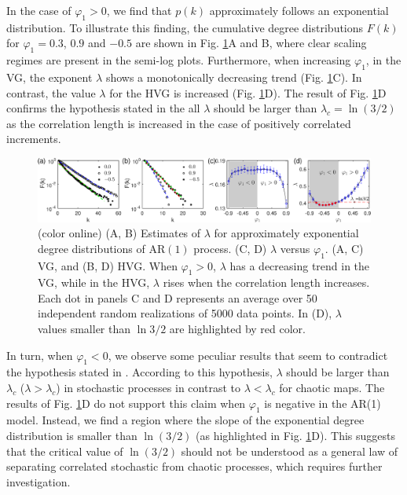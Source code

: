 		In the case of $\varphi_1 > 0$, we find that $p(k)$ approximately follows an exponential distribution. To illustrate this finding, the cumulative degree distributions $F(k)$ for $\varphi_1 = 0.3 $, $0.9$ and $-0.5$ are shown in Fig. \ref{fig:lambda_AR1}A and B, where clear scaling regimes are present in the semi-log plots. Furthermore, when increasing $\varphi_1$, in the VG, the exponent $\lambda$ shows a monotonically decreasing trend (Fig. \ref{fig:lambda_AR1}C). In contrast, the value $\lambda$ for the HVG is increased (Fig. \ref{fig:lambda_AR1}D). The result of Fig. \ref{fig:lambda_AR1}D confirms the hypothesis stated in \cite{Lacasa2010} the all $\lambda$ should be larger than $\lambda_c = \ln (3/2)$ as the correlation length is increased in the case of positively correlated increments.
\begin{figure}
	\centering
	\includegraphics[width=\columnwidth]{Chapter04_VisibilityGt/ar1_positive_lambda_vg_hvg.eps}

\caption{(color online) (A, B) Estimates of $\lambda$ for approximately exponential degree distributions of AR$(1)$ process. (C, D) $\lambda$ versus $\varphi_1$. (A, C) VG, and (B, D) HVG. When $\varphi_1>0$, $\lambda$ has a decreasing trend in the VG, while in the HVG, $\lambda$ rises when the correlation length increases. Each dot in panels C and D represents an average over 50 independent random realizations of 5000 data points. In (D), $\lambda$ values smaller than $\ln 3/2$ are highlighted by red color. \label{fig:lambda_AR1}}
\end{figure}

		In turn, when $\varphi_1 < 0$, we observe some peculiar results that seem to contradict the hypothesis stated in \cite{Lacasa2010}. According to this hypothesis, $\lambda$ should be larger than $\lambda_c$ ($\lambda > \lambda_c$) in stochastic processes in contrast to $\lambda < \lambda_c$ for chaotic maps. The results of Fig. \ref{fig:lambda_AR1}D do not support this claim when $\varphi_1$ is negative in the AR(1) model. Instead, we find a region where the slope of the exponential degree distribution is smaller than $\ln (3/2)$ (as highlighted in Fig. \ref{fig:lambda_AR1}D). This suggests that the critical value of $\ln (3/2)$ should not be understood as a general law of separating correlated stochastic from chaotic processes, which requires further investigation. 

